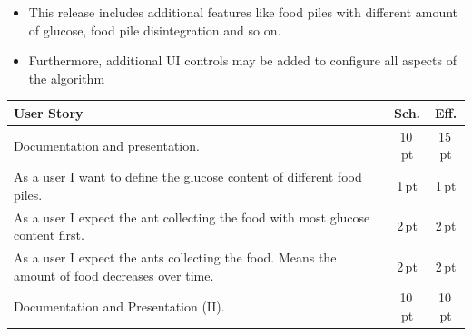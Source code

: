 \begin{itemize}[noitemsep]
\item This release includes additional features like food piles with different amount of glucose, food pile disintegration and so on.
\item Furthermore, additional UI controls may be added to configure all aspects of the algorithm
\end{itemize}


\begin{table}[H]
\small\sffamily\renewcommand{\arraystretch}{1.5}
\begin{tabular}{| p{12cm} | c | c |}
  \hline
  \bfseries{User Story} & \bfseries{Sch.} & \bfseries{Eff.}  \\
  \hline
  Documentation and presentation. & 10\,pt & 15\,pt \\
  \hline
  As a user I want to define the glucose content of different food piles. &
  1\,pt &1\,pt \\
  \hline
  As a user I expect the ant collecting the food with most glucose content first. & 2\,pt &2\,pt \\
  \hline
  As a user I expect the ants collecting the food. Means the amount of food decreases over time. & 2\,pt & 2\,pt \\
  \hline
  Documentation and Presentation (II). & 10\,pt & 10\,pt \\
  \hline
\end{tabular}
\end{table}


